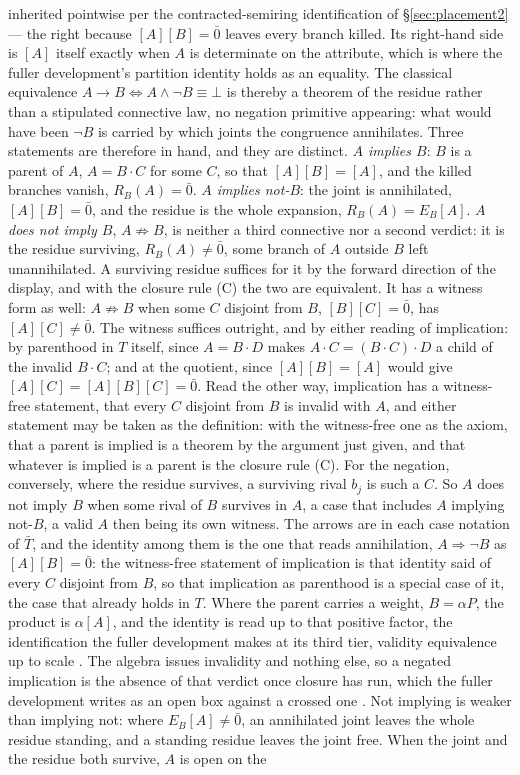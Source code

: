 inherited pointwise per the contracted-semiring identification of \S\ref{sec:placement2} --- the right because $[A][B] = \bar{0}$ leaves every branch killed. Its right-hand side is $[A]$ itself exactly when $A$ is determinate on the attribute, which is where the fuller development's partition identity holds as an equality. The classical equivalence $A \to B \iff A \wedge \lnot B \equiv \bot$ is thereby a theorem of the residue rather than a stipulated connective law, no negation primitive appearing: what would have been $\lnot B$ is carried by which joints the congruence annihilates. Three statements are therefore in hand, and they are distinct. \emph{$A$ implies $B$}: $B$ is a parent of $A$, $A = B \cdot C$ for some $C$, so that $[A][B] = [A]$, and the killed branches vanish, $R_B(A) = \bar{0}$. \emph{$A$ implies not-$B$}: the joint is annihilated, $[A][B] = \bar{0}$, and the residue is the whole expansion, $R_B(A) = E_B[A]$. \emph{$A$ does not imply $B$}, $A \not\Rightarrow B$, is neither a third connective nor a second verdict: it is the residue surviving, $R_B(A) \neq \bar{0}$, some branch of $A$ outside $B$ left unannihilated. A surviving residue suffices for it by the forward direction of the display, and with the closure rule (C) the two are equivalent. It has a witness form as well: $A \not\Rightarrow B$ when some $C$ disjoint from $B$, $[B][C] = \bar{0}$, has $[A][C] \neq \bar{0}$. The witness suffices outright, and by either reading of implication: by parenthood in $T$ itself, since $A = B \cdot D$ makes $A \cdot C = (B \cdot C) \cdot D$ a child of the invalid $B \cdot C$; and at the quotient, since $[A][B] = [A]$ would give $[A][C] = [A][B][C] = \bar{0}$. Read the other way, implication has a witness-free statement, that every $C$ disjoint from $B$ is invalid with $A$, and either statement may be taken as the definition: with the witness-free one as the axiom, that a parent is implied is a theorem by the argument just given, and that whatever is implied is a parent is the closure rule (C). For the negation, conversely, where the residue survives, a surviving rival $b_j$ is such a $C$. So $A$ does not imply $B$ when some rival of $B$ survives in $A$, a case that includes $A$ implying not-$B$, a valid $A$ then being its own witness. The arrows are in each case notation of $\bar{T}$, and the identity among them is the one that reads annihilation, $A \Rightarrow \lnot B$ as $[A][B] = \bar{0}$: the witness-free statement of implication is that identity said of every $C$ disjoint from $B$, so that implication as parenthood is a special case of it, the case that already holds in $T$. Where the parent carries a weight, $B = \alpha P$, the product is $\alpha[A]$, and the identity is read up to that positive factor, the identification the fuller development makes at its third tier, validity equivalence up to scale \cite{Aethus}. The algebra issues invalidity and nothing else, so a negated implication is the absence of that verdict once closure has run, which the fuller development writes as an open box against a crossed one \cite{Aethus}. Not implying is weaker than implying not: where $E_B[A] \neq \bar{0}$, an annihilated joint leaves the whole residue standing, and a standing residue leaves the joint free. When the joint and the residue both survive, $A$ is open on the 